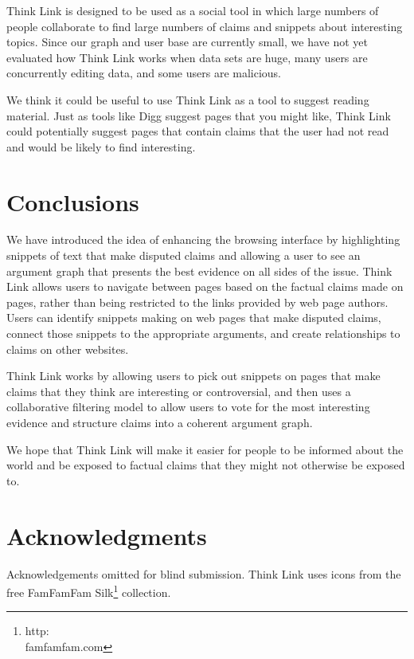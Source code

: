 \documentclass{chi2009}
\newcommand{\todo}[1]{}
\begin{document}
Think Link is designed to be used as a social tool in which large numbers of people collaborate to find large numbers of claims and snippets about interesting topics. Since our graph and user base are currently small, we have not yet evaluated how Think Link works when data sets are huge, many users are concurrently editing data, and some users are malicious. %

We think it could be useful to use Think Link as a tool to suggest reading material. Just as tools like Digg suggest pages that you might like, Think Link could potentially suggest pages that contain claims that the user had not read and would be likely to find interesting.

\section{Conclusions}

We have introduced the idea of enhancing the browsing interface by highlighting snippets of text that make disputed claims and allowing a user to see an argument graph that presents the best evidence on all sides of the issue.  %
Think Link allows users to navigate between pages based on the factual claims made on pages, rather than being restricted to the links provided by web page authors.  %
Users can identify snippets making on web pages that make disputed claims, connect those snippets to the appropriate arguments, and create relationships to claims on other websites.  %

Think Link works by allowing users to pick out snippets on pages that make claims that they think are interesting or controversial, and then uses a collaborative filtering model to allow users to vote for the most interesting evidence and structure claims into a coherent argument graph. %

We hope that Think Link will make it easier for people to be informed about the world and be exposed to factual claims that they might not otherwise be exposed to.

\section{Acknowledgments}

Acknowledgements omitted for blind submission. Think Link uses icons from the free FamFamFam Silk\footnote{http:\\famfamfam.com} collection.


\todo{Sort out bad references}

\end{document}
